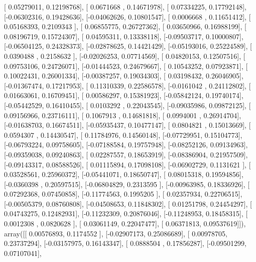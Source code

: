 \documentclass{article}
\begin{document}
       [ 0.05279011,  0.12198768],
       [ 0.0671668 ,  0.14671978],
       [ 0.07334225,  0.17792148],
       [-0.06302316,  0.19428636],
       [-0.04062626,  0.10801547],
       [ 0.0006668 ,  0.11651412],
       [ 0.05168393,  0.2109343 ],
       [ 0.06855775,  0.26727362],
       [ 0.03650966,  0.16988199],
       [ 0.08196719,  0.15724307],
       [ 0.04595311,  0.13338118],
       [-0.09503717,  0.10000807],
       [-0.06504125,  0.24328373],
       [-0.02878625,  0.14421429],
       [-0.05193016,  0.25224589],
       [ 0.0390488 ,  0.2158632 ],
       [-0.02026253,  0.07714569],
       [ 0.04820153,  0.12507516],
       [ 0.09753106,  0.24726071],
       [-0.01444523,  0.24679667],
       [ 0.10543252,  0.07923871],
       [ 0.10022431,  0.26001334],
       [-0.00387257,  0.19034303],
       [ 0.03198432,  0.26046905],
       [-0.01367474,  0.17217953],
       [ 0.11310339,  0.22586578],
       [-0.0161042 ,  0.24112802],
       [ 0.01663061,  0.16709451],
       [ 0.00586297,  0.15381923],
       [-0.05842124,  0.19740174],
       [-0.05442529,  0.16410455],
       [ 0.0103292 ,  0.22043545],
       [-0.09035986,  0.09872125],
       [ 0.09156966,  0.23716111],
       [ 0.1067913 ,  0.14681818],
       [ 0.0994001 ,  0.26914704],
       [-0.01638703,  0.16674511],
       [-0.05935437,  0.10477147],
       [ 0.0804821 ,  0.15013669],
       [ 0.0594307 ,  0.14430547],
       [ 0.11784976,  0.14560148],
       [-0.07729951,  0.15104773],
       [-0.06793224,  0.09758605],
       [-0.07188584,  0.19757948],
       [-0.08252126,  0.09134963],
       [-0.09359038,  0.09240863],
       [ 0.02287557,  0.18653919],
       [-0.08386904,  0.21957509],
       [-0.09143317,  0.08588526],
       [ 0.01115894,  0.17098108],
       [-0.06902729,  0.1131621 ],
       [ 0.03528561,  0.25960372],
       [-0.05441071,  0.18650747],
       [ 0.08015318,  0.19594856],
       [-0.0360398 ,  0.20597515],
       [-0.06804829,  0.2313595 ],
       [-0.00963985,  0.18336926],
       [ 0.07292368,  0.07450858],
       [-0.11774563,  0.1995205 ],
       [ 0.02357934,  0.22706515],
       [-0.00505379,  0.08760808],
       [-0.04508653,  0.11848302],
       [ 0.01251798,  0.24454297],
       [ 0.04743275,  0.12482931],
       [-0.11232309,  0.20876046],
       [-0.11248953,  0.18458315],
       [ 0.0012308 ,  0.0820628 ],
       [ 0.03061149,  0.22047477],
       [ 0.06371813,  0.09537619]]), array([[ 0.00576893,  0.1174552 ],
       [-0.02907173,  0.25086689],
       [ 0.00978705,  0.23737294],
       [-0.03157975,  0.16143347],
       [ 0.0888504 ,  0.17856287],
       [-0.09501299,  0.07107041],
\end{document}
